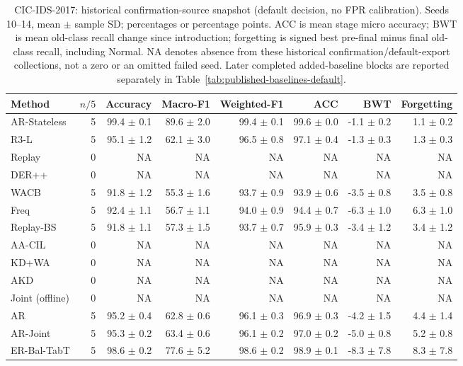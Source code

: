 \begin{table}[t]\centering\scriptsize
\caption{CIC-IDS-2017: historical confirmation-source snapshot (default decision, no FPR calibration). Seeds 10--14, mean $\pm$ sample SD; percentages or percentage points. ACC is mean stage micro accuracy; BWT is mean old-class recall change since introduction; forgetting is signed best pre-final minus final old-class recall, including Normal. NA denotes absence from these historical confirmation/default-export collections, not a zero or an omitted failed seed. Later completed added-baseline blocks are reported separately in Table~\ref{tab:published-baselines-default}.}
\label{tab:default-cic}
\begin{tabular}{lrrrrrrr}\toprule
Method & $n/5$ & Accuracy & Macro-F1 & Weighted-F1 & ACC & BWT & Forgetting \\\midrule
AR-Stateless & 5 & 99.4 $\pm$ 0.1 & 89.6 $\pm$ 2.0 & 99.4 $\pm$ 0.1 & 99.6 $\pm$ 0.0 & -1.1 $\pm$ 0.2 & 1.1 $\pm$ 0.2 \\
R3-L & 5 & 95.1 $\pm$ 1.2 & 62.1 $\pm$ 3.0 & 96.5 $\pm$ 0.8 & 97.1 $\pm$ 0.4 & -1.3 $\pm$ 0.3 & 1.3 $\pm$ 0.3 \\
Replay & 0 & NA & NA & NA & NA & NA & NA \\
DER++ & 0 & NA & NA & NA & NA & NA & NA \\
WACB & 5 & 91.8 $\pm$ 1.2 & 55.3 $\pm$ 1.6 & 93.7 $\pm$ 0.9 & 93.9 $\pm$ 0.6 & -3.5 $\pm$ 0.8 & 3.5 $\pm$ 0.8 \\
Freq & 5 & 92.4 $\pm$ 1.1 & 56.7 $\pm$ 1.1 & 94.0 $\pm$ 0.9 & 94.4 $\pm$ 0.7 & -6.3 $\pm$ 1.0 & 6.3 $\pm$ 1.0 \\
Replay-BS & 5 & 91.8 $\pm$ 1.1 & 57.3 $\pm$ 1.5 & 93.7 $\pm$ 0.7 & 95.9 $\pm$ 0.3 & -3.4 $\pm$ 1.2 & 3.4 $\pm$ 1.2 \\
AA-CIL & 0 & NA & NA & NA & NA & NA & NA \\
KD+WA & 0 & NA & NA & NA & NA & NA & NA \\
AKD & 0 & NA & NA & NA & NA & NA & NA \\
Joint (offline) & 0 & NA & NA & NA & NA & NA & NA \\
AR & 5 & 95.2 $\pm$ 0.4 & 62.8 $\pm$ 0.6 & 96.1 $\pm$ 0.3 & 96.9 $\pm$ 0.3 & -4.2 $\pm$ 1.5 & 4.4 $\pm$ 1.4 \\
AR-Joint & 5 & 95.3 $\pm$ 0.2 & 63.4 $\pm$ 0.6 & 96.1 $\pm$ 0.2 & 97.0 $\pm$ 0.2 & -5.0 $\pm$ 0.8 & 5.2 $\pm$ 0.8 \\
ER-Bal-TabT & 5 & 98.6 $\pm$ 0.2 & 77.6 $\pm$ 5.2 & 98.6 $\pm$ 0.2 & 98.9 $\pm$ 0.1 & -8.3 $\pm$ 7.8 & 8.3 $\pm$ 7.8 \\
\bottomrule\end{tabular}\end{table}
